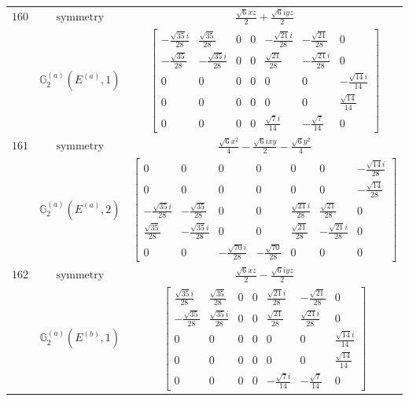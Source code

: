 \documentclass[fleqn,8pt,landscape]{jsarticle}
\begin{document}
\begin{longtable}{ccc}
$ 160 $ & $ \text{symmetry} $ & $ \frac{\sqrt{6} x z}{2} + \frac{\sqrt{6} i y z}{2} $ \\
$  $ & $ \mathbb{G}_{2}^{(a)}(E^{(a)},1) $ & $ \begin{bmatrix} - \frac{\sqrt{35} i}{28} & \frac{\sqrt{35}}{28} & 0 & 0 & - \frac{\sqrt{21} i}{28} & - \frac{\sqrt{21}}{28} & 0 \\ - \frac{\sqrt{35}}{28} & - \frac{\sqrt{35} i}{28} & 0 & 0 & \frac{\sqrt{21}}{28} & - \frac{\sqrt{21} i}{28} & 0 \\ 0 & 0 & 0 & 0 & 0 & 0 & - \frac{\sqrt{14} i}{14} \\ 0 & 0 & 0 & 0 & 0 & 0 & \frac{\sqrt{14}}{14} \\ 0 & 0 & 0 & 0 & \frac{\sqrt{7} i}{14} & - \frac{\sqrt{7}}{14} & 0 \end{bmatrix} $ \\ \hline
$ 161 $ & $ \text{symmetry} $ & $ \frac{\sqrt{6} x^{2}}{4} - \frac{\sqrt{6} i x y}{2} - \frac{\sqrt{6} y^{2}}{4} $ \\
$  $ & $ \mathbb{G}_{2}^{(a)}(E^{(a)},2) $ & $ \begin{bmatrix} 0 & 0 & 0 & 0 & 0 & 0 & - \frac{\sqrt{14} i}{28} \\ 0 & 0 & 0 & 0 & 0 & 0 & - \frac{\sqrt{14}}{28} \\ - \frac{\sqrt{35} i}{28} & - \frac{\sqrt{35}}{28} & 0 & 0 & \frac{\sqrt{21} i}{28} & \frac{\sqrt{21}}{28} & 0 \\ \frac{\sqrt{35}}{28} & - \frac{\sqrt{35} i}{28} & 0 & 0 & \frac{\sqrt{21}}{28} & - \frac{\sqrt{21} i}{28} & 0 \\ 0 & 0 & - \frac{\sqrt{70} i}{28} & - \frac{\sqrt{70}}{28} & 0 & 0 & 0 \end{bmatrix} $ \\ \hline
$ 162 $ & $ \text{symmetry} $ & $ \frac{\sqrt{6} x z}{2} - \frac{\sqrt{6} i y z}{2} $ \\
$  $ & $ \mathbb{G}_{2}^{(a)}(E^{(b)},1) $ & $ \begin{bmatrix} \frac{\sqrt{35} i}{28} & \frac{\sqrt{35}}{28} & 0 & 0 & \frac{\sqrt{21} i}{28} & - \frac{\sqrt{21}}{28} & 0 \\ - \frac{\sqrt{35}}{28} & \frac{\sqrt{35} i}{28} & 0 & 0 & \frac{\sqrt{21}}{28} & \frac{\sqrt{21} i}{28} & 0 \\ 0 & 0 & 0 & 0 & 0 & 0 & \frac{\sqrt{14} i}{14} \\ 0 & 0 & 0 & 0 & 0 & 0 & \frac{\sqrt{14}}{14} \\ 0 & 0 & 0 & 0 & - \frac{\sqrt{7} i}{14} & - \frac{\sqrt{7}}{14} & 0 \end{bmatrix} $ \\ \hline

\end{longtable}
\end{document}
